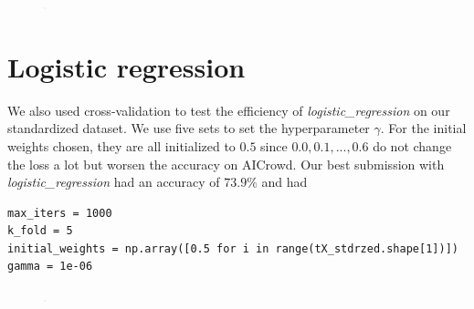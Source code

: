 \documentclass[11pt, a4paper, twoside]{article}
\begin{document}
\begin{figure}
    \includegraphics[width= 3, height = 3]{raw_data_least_squares_GD_useful.png}
    \label{fig:lsgd_useful}
\end{figure}

\section{Logistic regression}
We also used cross-validation to test the efficiency of \textit{logistic_regression} on our standardized dataset.
We use five sets to set the hyperparameter $\gamma$.
For the initial weights chosen, they are all initialized to $0.5$ since $0.0, 0.1, ..., 0.6$ do not change the loss a lot but worsen the accuracy on AICrowd.
Our best submission with \textit{logistic_regression} had an accuracy of $73.9\%$ and had 
\begin{lstlisting}
max_iters = 1000
k_fold = 5
initial_weights = np.array([0.5 for i in range(tX_stdrzed.shape[1])])
gamma = 1e-06
\end{lstlisting}

\begin{figure}
    \includegraphics[width= 3, height = 3]{raw_data_logistic_regression.png}
    \label{fig:log_reg}
\end{figure}
\end{document}

